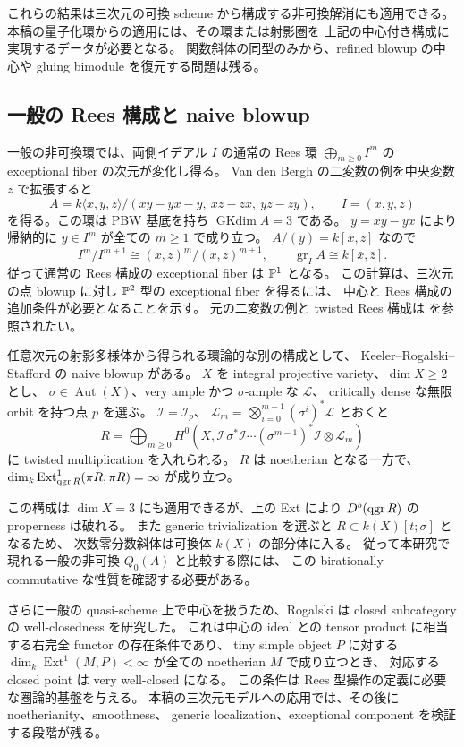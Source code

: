 これらの結果は三次元の可換 scheme から構成する非可換解消にも適用できる。
本稿の量子化環からの適用には、その環または射影圏を
上記の中心付き構成に実現するデータが必要となる。
関数斜体の同型のみから、refined blowup の中心や gluing bimodule を復元する問題は残る。

\subsection{一般の Rees 構成と naive blowup}
\label{blowup:naive}

一般の非可換環では、両側イデアル $I$ の通常の Rees 環
$\bigoplus_{m\geq0}I^m$ の exceptional fiber の次元が変化し得る。
Van den Bergh の二変数の例を中央変数 $z$ で拡張すると
\[
 A=k\langle x,y,z\rangle/
 (xy-yx-y,\ xz-zx,\ yz-zy),\qquad I=(x,y,z)
\]
を得る。この環は PBW 基底を持ち $\operatorname{GKdim}A=3$ である。
$y=xy-yx$ により帰納的に $y\in I^m$ が全ての $m\geq1$ で成り立つ。
$A/(y)=k[x,z]$ なので
\[
 I^m/I^{m+1}\cong (x,z)^m/(x,z)^{m+1},\qquad
 \operatorname{gr}_I A\cong k[\bar x,\bar z].
\]
従って通常の Rees 構成の exceptional fiber は $\mathbb P^1$ となる。
この計算は、三次元の点 blowup に対し $\mathbb P^2$ 型の exceptional fiber を得るには、
中心と Rees 構成の追加条件が必要となることを示す。
元の二変数の例と twisted Rees 構成は
\cite[\S1.1]{BlowupVdB2001} を参照されたい。

任意次元の射影多様体から得られる環論的な別の構成として、
Keeler--Rogalski--Stafford の naive blowup がある。
$X$ を integral projective variety、$\dim X\geq2$ とし、
$\sigma\in\operatorname{Aut}(X)$、very ample かつ $\sigma$-ample な $\mathcal L$、
critically dense な無限 orbit を持つ点 $p$ を選ぶ。
$\mathcal I=\mathcal I_p$、
$\mathcal L_m=\bigotimes_{i=0}^{m-1}(\sigma^i)^*\mathcal L$ とおくと
\[
 R=\bigoplus_{m\geq0}
 H^0\!\left(X,
   \mathcal I\,\sigma^*\mathcal I\cdots(\sigma^{m-1})^*\mathcal I
   \otimes\mathcal L_m\right)
\]
に twisted multiplication を入れられる。
$R$ は noetherian となる一方で、
$\dim_k\operatorname{Ext}^1_{\operatorname{qgr} R}(\pi R,\pi R)=\infty$ が成り立つ。
\cite[定理1.1]{BlowupKRS2005}

この構成は $\dim X=3$ にも適用できるが、上の Ext により
$D^b(\operatorname{qgr} R)$ の properness は破れる。
また generic trivialization を選ぶと $R\subset k(X)[t;\sigma]$ となるため、
次数零分数斜体は可換体 $k(X)$ の部分体に入る。
従って本研究で現れる一般の非可換 $Q_0(A)$ と比較する際には、
この birationally commutative な性質を確認する必要がある。

さらに一般の quasi-scheme 上で中心を扱うため、Rogalski は
closed subcategory の well-closedness を研究した。
これは中心の ideal との tensor product に相当する右完全 functor の存在条件であり、
tiny simple object $P$ に対する
$\dim_k\operatorname{Ext}^1(M,P)<\infty$ が全ての noetherian $M$ で成り立つとき、
対応する closed point は very well-closed になる。
\cite[定理1.3、定理6.6]{BlowupRogalski2019}
この条件は Rees 型操作の定義に必要な圏論的基盤を与える。
本稿の三次元モデルへの応用では、その後に noetherianity、smoothness、
generic localization、exceptional component を検証する段階が残る。

